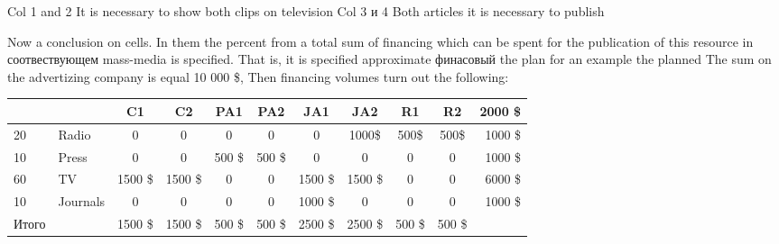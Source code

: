 \documentclass[a4paper,11pt]{scrartcl}
\begin{document}
Col 1 and  2 
It is necessary to show both clips on television
Col  3  и 4
Both articles it is necessary to publish


\bigskip

Now a conclusion on cells. In them the percent from a total sum of financing which can be spent for the publication of this resource in соотвествующем mass-media is specified. 
That is, it is specified approximate финасовый the plan for an example the planned 
The sum on the advertizing company is equal 10 000 \$,
Then financing volumes turn out the following:

 \begin{tabular}{|l|l |c| c| c| c| c| c| c| c|r|}
\hline
&      &  C1 & C2  &  PA1 & PA2 & JA1 & JA2 & R1 & R2 &2000 \$\\
\hline
20&Radio &  0 & 0  &  0 & 0 & 0 & 1000\$ & 500\$ & 500\$  & 1000 \$\\
\hline
10&Press &  0 & 0  &  500 \$ & 500 \$ &  0 & 0 & 0 & 0 &1000 \$ \\
\hline
60&TV &  1500 \$ & 1500 \$  &  0 & 0 & 1500 \$ & 1500 \$ & 0 & 0 &6000 \$\\
\hline
10&Journals &  0 & 0  &  0 & 0 & 1000 \$ & 0 & 0 & 0 & 1000 \$ \\
\hline
Итого & &   1500 \$&  1500 \$  &  500 \$ & 500 \$  & 2500 \$  & 2500 \$ & 500 \$  & 500 \$ & \\
\hline
\end{tabular}
\end{document}
